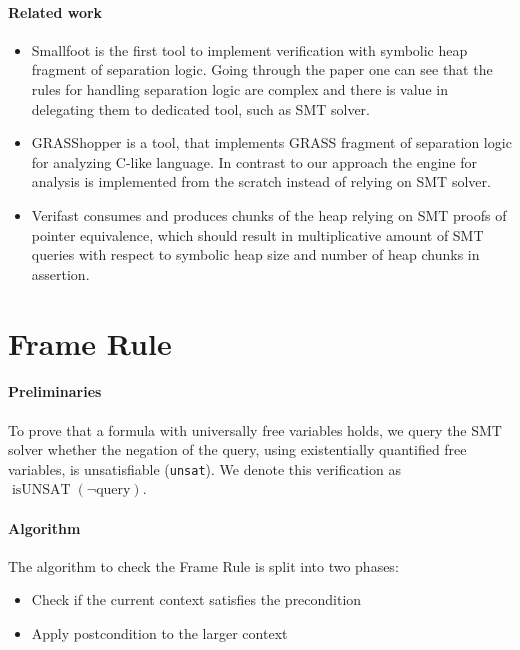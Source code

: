 \documentclass[sigplan,screen,review]{acmart}
\begin{document}
\paragraph{Related work}
\begin{itemize}
    \item Smallfoot\cite{DBLP:conf/fmco/BerdineCO05} is the first tool to implement verification with symbolic heap fragment of separation logic. Going through the paper one can see that the rules for handling separation logic are complex and there is value in delegating them to dedicated tool, such as SMT solver.
    \item GRASShopper\cite{piskac2014grasshopper} is a tool, that implements GRASS fragment of separation logic for analyzing C-like language. In contrast to our approach the engine for analysis is implemented from the scratch instead of relying on SMT solver. 
    \item Verifast\cite{jacobs2011verifast} consumes and produces chunks of the heap relying on SMT proofs of pointer equivalence, which should result in multiplicative amount of SMT queries with respect to symbolic heap size and number of heap chunks in assertion. 
\end{itemize}

\section{Frame Rule}


\paragraph{Preliminaries} To prove that a formula with universally free variables holds, we query the SMT solver whether the negation of the query, using existentially quantified free variables, is unsatisfiable (\texttt{unsat}). We denote this verification as $\operatorname{isUNSAT}(\neg\mbox{query})$.


\paragraph{Algorithm} The algorithm to check the Frame Rule is split into two phases: 

\begin{itemize}
    \item Check if the current context satisfies the precondition
    \item Apply postcondition to the larger context
\end{itemize}
\end{document}

